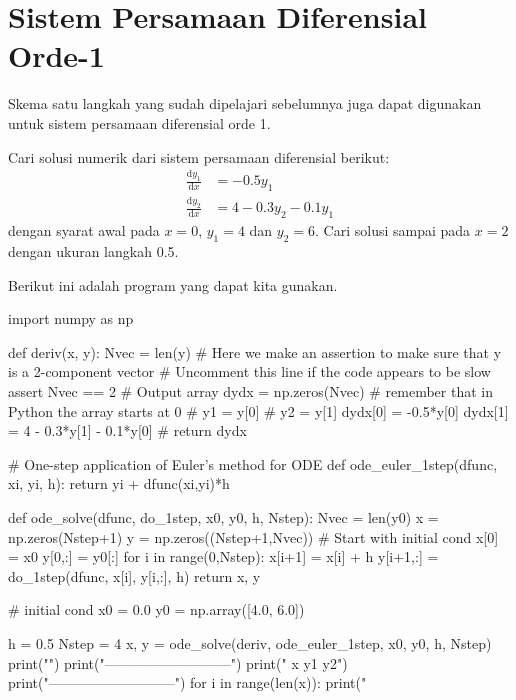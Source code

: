 \section{Sistem Persamaan Diferensial Orde-1}

Skema satu langkah yang sudah dipelajari sebelumnya juga dapat digunakan
untuk sistem persamaan diferensial orde 1.

\begin{soal}
Cari solusi numerik dari sistem persamaan diferensial berikut:
\begin{align*}
\frac{\mathrm{d}y_1}{\mathrm{d}x} & = -0.5 y_1 \\
\frac{\mathrm{d}y_2}{\mathrm{d}x} & = 4 - 0.3 y_2 - 0.1y_1
\end{align*}
dengan syarat awal pada $x=0$, $y_1 = 4$ dan $y_2 = 6$.
Cari solusi sampai pada $x=2$ dengan ukuran langkah 0.5.
\end{soal}

Berikut ini adalah program yang dapat kita gunakan.
\begin{pythoncode}
import numpy as np

def deriv(x, y):
    Nvec = len(y)
    # Here we make an assertion to make sure that y is a 2-component vector
    # Uncomment this line if the code appears to be slow
    assert Nvec == 2
    # Output array
    dydx = np.zeros(Nvec)
    # remember that in Python the array starts at 0
    # y1 = y[0]
    # y2 = y[1]
    dydx[0] = -0.5*y[0]
    dydx[1] = 4 - 0.3*y[1] - 0.1*y[0]
    # 
    return dydx
    
# One-step application of Euler's method for ODE
def ode_euler_1step(dfunc, xi, yi, h):
    return yi + dfunc(xi,yi)*h
    
def ode_solve(dfunc, do_1step, x0, y0, h, Nstep):
    Nvec = len(y0)
    x = np.zeros(Nstep+1)
    y = np.zeros((Nstep+1,Nvec))
    # Start with initial cond
    x[0] = x0
    y[0,:] = y0[:]
    for i in range(0,Nstep):
        x[i+1] = x[i] + h
        y[i+1,:] = do_1step(dfunc, x[i], y[i,:], h)
    return x, y
    
# initial cond
x0 = 0.0
y0 = np.array([4.0, 6.0])

h = 0.5
Nstep = 4
x, y = ode_solve(deriv, ode_euler_1step, x0, y0, h, Nstep)
print("")
print("---------------------------")
print(" x         y1         y2")
print("---------------------------")
for i in range(len(x)):
    print("%
\end{pythoncode}

